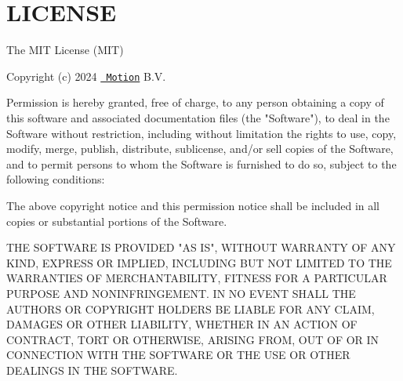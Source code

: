 \chapter{LICENSE}
\hypertarget{md_node__modules_2motion-dom_2_l_i_c_e_n_s_e}{}\label{md_node__modules_2motion-dom_2_l_i_c_e_n_s_e}
The MIT License (MIT)

Copyright (c) 2024 \href{https://motion.dev}{\texttt{ Motion}} B.\+V.

Permission is hereby granted, free of charge, to any person obtaining a copy of this software and associated documentation files (the "{}\+Software"{}), to deal in the Software without restriction, including without limitation the rights to use, copy, modify, merge, publish, distribute, sublicense, and/or sell copies of the Software, and to permit persons to whom the Software is furnished to do so, subject to the following conditions\+:

The above copyright notice and this permission notice shall be included in all copies or substantial portions of the Software.

THE SOFTWARE IS PROVIDED "{}\+AS IS"{}, WITHOUT WARRANTY OF ANY KIND, EXPRESS OR IMPLIED, INCLUDING BUT NOT LIMITED TO THE WARRANTIES OF MERCHANTABILITY, FITNESS FOR A PARTICULAR PURPOSE AND NONINFRINGEMENT. IN NO EVENT SHALL THE AUTHORS OR COPYRIGHT HOLDERS BE LIABLE FOR ANY CLAIM, DAMAGES OR OTHER LIABILITY, WHETHER IN AN ACTION OF CONTRACT, TORT OR OTHERWISE, ARISING FROM, OUT OF OR IN CONNECTION WITH THE SOFTWARE OR THE USE OR OTHER DEALINGS IN THE SOFTWARE. 